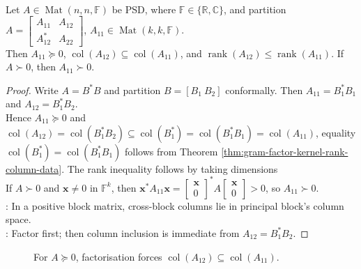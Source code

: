 \begin{corollary} \label{cor:positive-semidefinite-principal-block-column-inclusion} \\
Let $A\in\operatorname{Mat}(n,n,\mathbb{F})$ be PSD, where $\mathbb{F}\in\{\mathbb{R},\mathbb{C}\}$, and partition $A=
\begin{bmatrix}
A_{11} & A_{12}\\
A_{12}^* & A_{22}
\end{bmatrix}$, $A_{11}\in\operatorname{Mat}(k,k,\mathbb{F})$.\\
Then $A_{11}\succeq0$, $\operatorname{col}(A_{12})\subseteq\operatorname{col}(A_{11})$, and $\operatorname{rank}(A_{12})\leq\operatorname{rank}(A_{11})$. If $A\succ0$, then $A_{11}\succ0$.
\begin{proof}
Write $A=B^*B$ and partition $B=[B_1\ B_2]$ conformally. Then $A_{11}=B_1^*B_1$ and $A_{12}=B_1^*B_2$.\\
Hence $A_{11}\succeq0$ and $\operatorname{col}(A_{12})=\operatorname{col}(B_1^*B_2)\subseteq\operatorname{col}(B_1^*)=\operatorname{col}(B_1^*B_1)=\operatorname{col}(A_{11})$, equality $\operatorname{col}(B_1^*)=\operatorname{col}(B_1^*B_1)$ follows from Theorem \ref{thm:gram-factor-kernel-rank-column-data}. The rank inequality follows by taking dimensions\\
If $A\succ0$ and $\mathbf{x}\neq0$ in $\mathbb{F}^k$, then $\mathbf{x}^*A_{11}\mathbf{x}=
\begin{bmatrix}\mathbf{x}\\0\end{bmatrix}^*
A
\begin{bmatrix}\mathbf{x}\\0\end{bmatrix}>0$, so $A_{11}\succ0$.\\
: In a positive block matrix, cross-block columns lie in principal block's column space.\\
: Factor first; then column inclusion is immediate from $A_{12}=B_1^*B_2$.
\end{proof}
\end{corollary}

\begin{figure}[H]
  \centering
  
  \caption{For $A\succeq0$, factorisation forces $\operatorname{col}(A_{12})\subseteq\operatorname{col}(A_{11})$.}
  \label{fig:principal-block-column-inclusion}
\end{figure}

